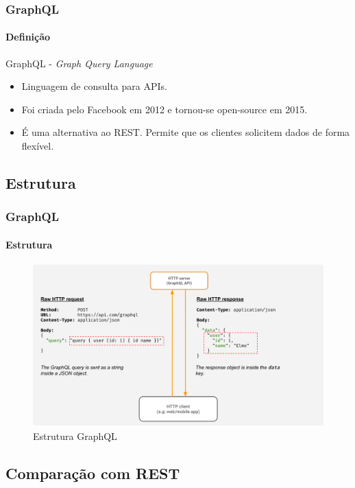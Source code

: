 \documentclass[
	9pt, %
	t, %
]{beamer}
\begin{document}
\begin{frame}
	\frametitle{GraphQL}
	\framesubtitle{Definição}

	\begin{block}{GraphQL - \textit{Graph Query Language}}
		\begin{itemize}
			\item Linguagem de consulta para APIs.
			\item Foi criada pelo Facebook em 2012 e tornou-se open-source em 2015.
			\item É uma alternativa ao REST. Permite que os clientes solicitem dados de forma flexível.
		\end{itemize}
	\end{block}

\end{frame}

\subsection{Estrutura}

\begin{frame}
	\frametitle{GraphQL}
	\framesubtitle{Estrutura}

	\begin{figure}
		\includegraphics[width=0.9\linewidth]{graphql.png}
		\caption{Estrutura GraphQL}
		\label{fig:graphql_structure}
	\end{figure}

\end{frame}

\subsection{Comparação com REST}
\end{document}
